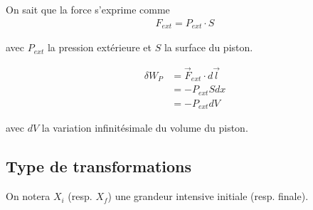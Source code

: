 On sait que la force s'exprime comme 
\begin{align*}
F_{ext} = P_{ext} \cdot S
\end{align*}

avec $P_{ext}$ la pression extérieure et $S$ la surface du piston.

\begin{align*}
\delta W_P &= \vec{F}_{ext} \cdot d\vec{l} \\
&= - P_{ext} S dx \\
&= -P_{ext} dV
\end{align*}

avec $dV$ la variation infinitésimale du volume du piston.



\subsection{Type de transformations}

On notera $X_i$ (resp. $X_f$) une grandeur intensive initiale (resp. finale). 


